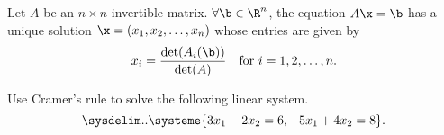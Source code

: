\begin{theorem}
  \label{thm:crammers_rule}

  Let $A$ be an $n \times n$ invertible matrix. $\forall \b \in \R^n$, the
  equation $A\x = \b$ has a unique solution $\x = (x_1, x_2, \ldots, x_n)$ whose
  entries are given by
  \[%
    x_i = \frac{\det(A_i(\b))}{\det(A)} \quad\textrm{for}~i=1,2,\ldots,n
  .\]%
\end{theorem}

\begin{question}
  \label{qst:crammers_rule_1}

  Use Cramer's rule to solve the following linear system.
  \[%
    \sysdelim..\systeme{
      3x_1 - 2x_2 = 6,
      -5x_1 + 4x_2 = 8
    }
  .\]%
\end{question}

